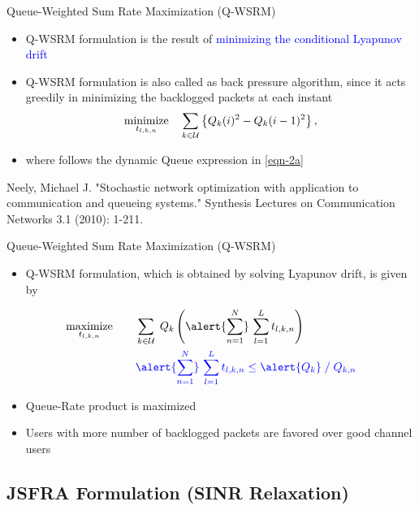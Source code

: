 \documentclass[9pt]{beamer}
\begin{document}
\begin{frame}{Queue-Weighted Sum Rate Maximization (\acs{Q-WSRM})}
\begin{itemize}
\item \acs{Q-WSRM} formulation is the result of \textcolor{blue}{minimizing the conditional Lyapunov drift}\eqn{^\dagger}
\item \acs{Q-WSRM} formulation is also called as \alert{back pressure algorithm}, since it acts greedily in minimizing the backlogged packets at each instant
\[ \underset{t_{l,k,n}}{\text{minimize}} \quad \sum_{k \in \mathcal{U}} \left \lbrace Q_k(i)^2 - Q_k(i-1)^2 \right \rbrace, \]
\item where  follows the dynamic Queue expression in \eqref{eqn-2a}
\end{itemize}

\vspace{2eM}
\eqn{^\dagger}\footnotesize{Neely, Michael J. "Stochastic network optimization with application to communication and queueing systems." Synthesis Lectures on Communication Networks 3.1 (2010): 1-211.}
\end{frame}

\begin{frame}{Queue-Weighted Sum Rate Maximization (\acs{Q-WSRM})}
\begin{itemize}
\item \acs{Q-WSRM} formulation, which is obtained by solving Lyapunov drift, is given by
\end{itemize}
\begin{subequations}
\begin{align}
 \underset{t_{l,k,n}}{\text{maximize}} & \qquad \sum_{k \in \mc{U}} \; Q_k \left ( \alert{\sum_{n=1}^N} \, \sum_{l = 1}^L  t_{l,k,n} \right ) \\
& \qquad {\color{blue} \alert{\sum_{n=1}^N} \, \sum_{l = 1}^L  t_{l,k,n}  \leq \alert{Q_k} \; / \; Q_{k,n}}
\end{align}
\end{subequations}
\begin{itemize}
\item Queue-Rate product is maximized
\item Users with more number of backlogged packets are favored over good channel users
\end{itemize}
\end{frame}

\subsection{\acs{JSFRA} Formulation (\acs{SINR} Relaxation)}
\end{document}
